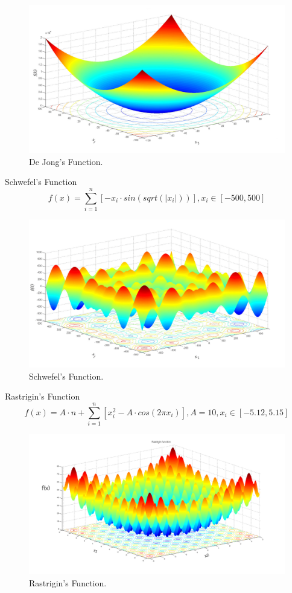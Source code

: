 \documentclass{article}
\begin{document}
\begin{figure}[!h]
  \includegraphics[width=\textwidth,height=\textheight,keepaspectratio]{De_Jong_function}
  \caption{De Jong's Function.}
\end{figure}

Schwefel's Function
$$ f(x) = \sum_{i=1}^n \left[-x_i \cdot sin(sqrt(|x_i|)) \right],
 x_i \in \left[ -500, 500 \right]$$

\begin{figure}[!h]
  \includegraphics[width=\textwidth,height=\textheight,keepaspectratio]{Schwefel_fucntion}
  \caption{ Schwefel's Function.}
\end{figure}

Rastrigin's Function
$$ f(x) = A \cdot n + \sum_{i=1}^n \left[ x_i^2 - A \cdot cos(2 \pi x_i) \right],
A = 10, x_i \in \left[ -5.12, 5.15 \right]$$

\begin{figure}[!h]
  \includegraphics[width=\textwidth,height=\textheight,keepaspectratio]{Rastrigin_function}
  \caption{Rastrigin's Function.}
\end{figure}
\end{document}

